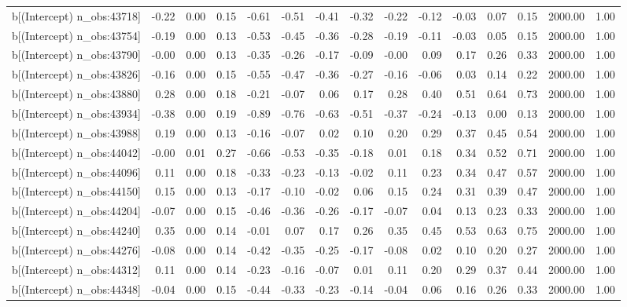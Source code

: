 \begin{table}[ht]
\begin{tabular}{rrrrrrrrrrrrrrr}
  b[(Intercept) n\_obs:43718] & -0.22 & 0.00 & 0.15 & -0.61 & -0.51 & -0.41 & -0.32 & -0.22 & -0.12 & -0.03 & 0.07 & 0.15 & 2000.00 & 1.00 \\ 
  b[(Intercept) n\_obs:43754] & -0.19 & 0.00 & 0.13 & -0.53 & -0.45 & -0.36 & -0.28 & -0.19 & -0.11 & -0.03 & 0.05 & 0.15 & 2000.00 & 1.00 \\ 
  b[(Intercept) n\_obs:43790] & -0.00 & 0.00 & 0.13 & -0.35 & -0.26 & -0.17 & -0.09 & -0.00 & 0.09 & 0.17 & 0.26 & 0.33 & 2000.00 & 1.00 \\ 
  b[(Intercept) n\_obs:43826] & -0.16 & 0.00 & 0.15 & -0.55 & -0.47 & -0.36 & -0.27 & -0.16 & -0.06 & 0.03 & 0.14 & 0.22 & 2000.00 & 1.00 \\ 
  b[(Intercept) n\_obs:43880] & 0.28 & 0.00 & 0.18 & -0.21 & -0.07 & 0.06 & 0.17 & 0.28 & 0.40 & 0.51 & 0.64 & 0.73 & 2000.00 & 1.00 \\ 
  b[(Intercept) n\_obs:43934] & -0.38 & 0.00 & 0.19 & -0.89 & -0.76 & -0.63 & -0.51 & -0.37 & -0.24 & -0.13 & 0.00 & 0.13 & 2000.00 & 1.00 \\ 
  b[(Intercept) n\_obs:43988] & 0.19 & 0.00 & 0.13 & -0.16 & -0.07 & 0.02 & 0.10 & 0.20 & 0.29 & 0.37 & 0.45 & 0.54 & 2000.00 & 1.00 \\ 
  b[(Intercept) n\_obs:44042] & -0.00 & 0.01 & 0.27 & -0.66 & -0.53 & -0.35 & -0.18 & 0.01 & 0.18 & 0.34 & 0.52 & 0.71 & 2000.00 & 1.00 \\ 
  b[(Intercept) n\_obs:44096] & 0.11 & 0.00 & 0.18 & -0.33 & -0.23 & -0.13 & -0.02 & 0.11 & 0.23 & 0.34 & 0.47 & 0.57 & 2000.00 & 1.00 \\ 
  b[(Intercept) n\_obs:44150] & 0.15 & 0.00 & 0.13 & -0.17 & -0.10 & -0.02 & 0.06 & 0.15 & 0.24 & 0.31 & 0.39 & 0.47 & 2000.00 & 1.00 \\ 
  b[(Intercept) n\_obs:44204] & -0.07 & 0.00 & 0.15 & -0.46 & -0.36 & -0.26 & -0.17 & -0.07 & 0.04 & 0.13 & 0.23 & 0.33 & 2000.00 & 1.00 \\ 
  b[(Intercept) n\_obs:44240] & 0.35 & 0.00 & 0.14 & -0.01 & 0.07 & 0.17 & 0.26 & 0.35 & 0.45 & 0.53 & 0.63 & 0.75 & 2000.00 & 1.00 \\ 
  b[(Intercept) n\_obs:44276] & -0.08 & 0.00 & 0.14 & -0.42 & -0.35 & -0.25 & -0.17 & -0.08 & 0.02 & 0.10 & 0.20 & 0.27 & 2000.00 & 1.00 \\ 
  b[(Intercept) n\_obs:44312] & 0.11 & 0.00 & 0.14 & -0.23 & -0.16 & -0.07 & 0.01 & 0.11 & 0.20 & 0.29 & 0.37 & 0.44 & 2000.00 & 1.00 \\ 
  b[(Intercept) n\_obs:44348] & -0.04 & 0.00 & 0.15 & -0.44 & -0.33 & -0.23 & -0.14 & -0.04 & 0.06 & 0.16 & 0.26 & 0.33 & 2000.00 & 1.00 \\ 

\end{tabular}
\end{table}

